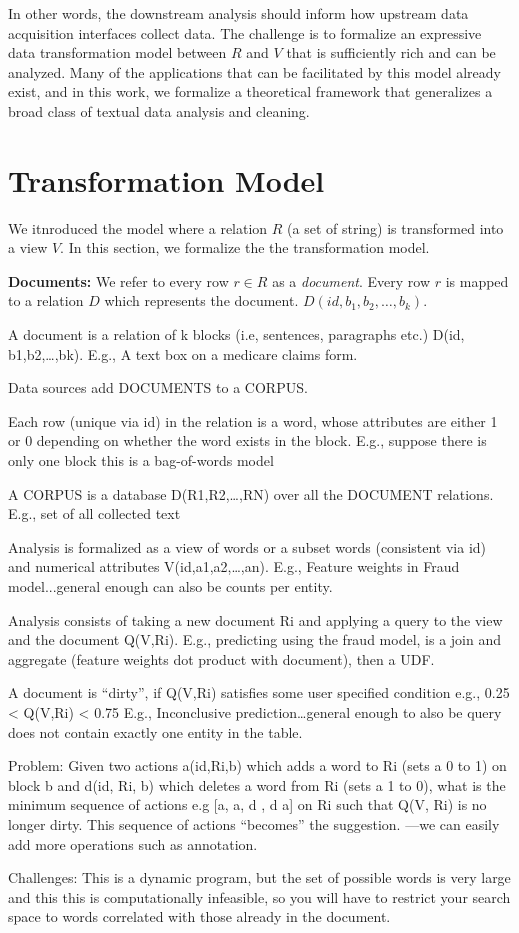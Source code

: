 In other words, the downstream analysis should inform how upstream data acquisition interfaces collect data.
The challenge is to formalize an expressive data transformation model between $R$ and $V$ that is sufficiently rich and can be analyzed.
Many of the applications that can be facilitated by this model already exist, and in this work, we formalize a theoretical framework that generalizes a broad class of textual data analysis and cleaning.

\section{Transformation Model}
We itnroduced the model where a relation $R$ (a set of string) is transformed into a view $V$.
In this section, we formalize the the transformation model.

\noindent\textbf{Documents: } We refer to every row $r \in R$ as a \emph{document}. Every row $r$ is mapped to a relation $D$ which represents the document. $D(id,b_1,b_2,…,b_k)$.


A document is a relation of k blocks (i.e, sentences, paragraphs etc.) D(id, b1,b2,…,bk). 
E.g., A text box on a medicare claims form.

Data sources add DOCUMENTS to a CORPUS.


 
Each row (unique via id) in the relation is a word, whose attributes are either 1 or 0 depending on whether the word exists in the block. 
E.g., suppose there is only one block this is a bag-of-words model

A CORPUS is a database D(R1,R2,…,RN) over all the DOCUMENT relations.
E.g., set of all collected text

Analysis is formalized as a view of words or a subset words (consistent via id) and numerical attributes V(id,a1,a2,…,an). 
E.g., Feature weights in Fraud model...general enough can also be counts per entity.

Analysis consists of taking a new document Ri and applying a query to the view and the document Q(V,Ri). 
E.g., predicting using the fraud model, is a join and aggregate (feature weights dot product with document), then a UDF.

A document is “dirty”, if Q(V,Ri) satisfies some user specified condition e.g.,  0.25 < Q(V,Ri) < 0.75
E.g., Inconclusive prediction…general enough to also be query does not contain exactly one entity in the table.

Problem: Given two actions a(id,Ri,b) which adds a word to Ri (sets a 0 to 1) on block b and d(id, Ri, b) which deletes a word from Ri (sets a 1 to 0), what is
the minimum sequence of actions e.g [a, a, d , d a] on Ri such that Q(V, Ri) is no longer dirty. This sequence of actions “becomes” the suggestion. —we can easily add more operations such as annotation.

Challenges: This is a dynamic program, but the set of possible words is very large and this this is computationally infeasible, so you will have to restrict your search space to words correlated with those already in the document.








